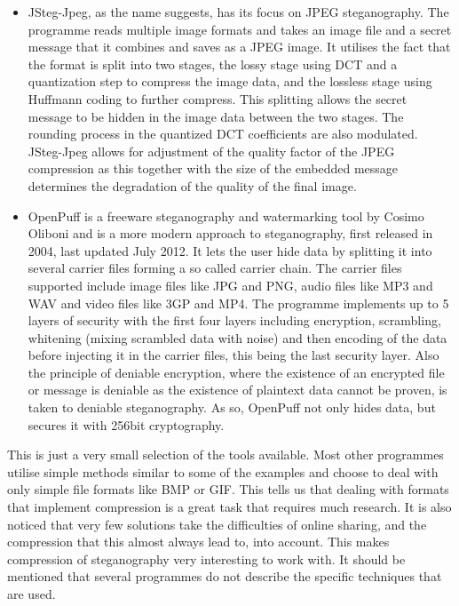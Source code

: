 \begin{itemize}
	\item JSteg-Jpeg, as the name suggests, has its focus on JPEG steganography. 
	The programme reads multiple image formats and takes an image file and a secret message that it combines and saves as a JPEG image. 
	It utilises the fact that the format is split into two stages, the lossy stage using DCT and a quantization step to compress the image data, and the lossless stage using Huffmann coding to further compress.  
	This splitting allows the secret message to be hidden in the image data between the two stages. The rounding process in the quantized DCT coefficients are also modulated. 
	JSteg-Jpeg allows for adjustment of the quality factor of the JPEG compression as this together with the size of the embedded message determines the degradation of the quality of the final image\citep{ImageProcessingFrankY}. 
	
	\item OpenPuff is a freeware steganography and watermarking tool by Cosimo Oliboni and is a more modern approach to steganography, first released in 2004, last updated July 2012. 
	It lets the user hide data by splitting it into several carrier files forming a so called carrier chain. The carrier files supported include image files like JPG and PNG, audio files like MP3 and WAV and video files like 3GP and MP4.
	The programme implements up to 5 layers of security with the first four layers including encryption, scrambling, whitening (mixing scrambled data with noise) and then encoding of the data before injecting it in the carrier files, this being the last security layer\citep{Oliboni2012}. 
	Also the principle of deniable encryption, where the existence of an encrypted file or message is deniable as the existence of plaintext data cannot be proven\citep{Schneier2008}, is taken to deniable steganography. As so, OpenPuff not only hides data, but secures it with 256bit cryptography.
\end{itemize}

This is just a very small selection of the tools available. 
Most other programmes utilise simple methods similar to some of the examples and choose to deal with only simple file formats like BMP or GIF. 
This tells us that dealing with formats that implement compression is a great task that requires much research. It is also noticed that very few solutions take the difficulties of online sharing, and the compression that this almost always lead to, into account. This makes compression of steganography very interesting to work with. 
It should be mentioned that several programmes do not describe the specific techniques that are used.
